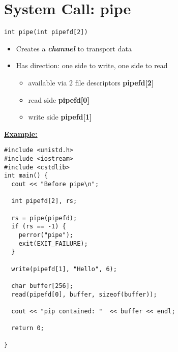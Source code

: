 \documentclass{report}
\begin{document}
\section{System Call: pipe}
\bigbreak \noindent
\begin{verbatim}
int pipe(int pipefd[2])
\end{verbatim}
\begin{itemize}
  \item Creates a \textit{\textbf{channel}} to transport data
  \item Has direction: one side to write, one side to read
    \begin{itemize}[label=$\circ$]
      \item available via 2 file descriptors \textbf{pipefd[2]}
      \item read side \textbf{pipefd[0]}
      \item write side \textbf{pipefd[1]}
    \end{itemize}
\end{itemize}
\bigbreak \noindent
\textbf{\underline{Example:}}
\begin{verbatim}
#include <unistd.h>
#include <iostream>
#include <cstdlib>
int main() {
  cout << "Before pipe\n";

  int pipefd[2], rs;
  
  rs = pipe(pipefd);
  if (rs == -1) {
    perror("pipe");
    exit(EXIT_FAILURE);
  }

  write(pipefd[1], "Hello", 6);
   
  char buffer[256];
  read(pipefd[0], buffer, sizeof(buffer));

  cout << "pip contained: "  << buffer << endl;

  return 0;

}
\end{verbatim}
\end{document}
